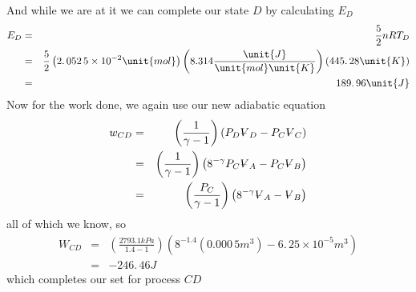 \documentclass{article}
\begin{document}
And while we are at it we can complete our state $D$ by calculating $E_{D}$%
\begin{eqnarray*}
E_{D} &=&\frac{5}{2}nRT_{D} \\
&=&\frac{5}{2}\left( \allowbreak 2.\,\allowbreak 052\,5\times 10^{-2}\unit{%
mol}\right) \left( 8.314\frac{\unit{J}}{\unit{mol}\unit{K}}\right) \left(
445.\,\allowbreak 28\unit{K}\right) \\
&=&189.\,\allowbreak 96\unit{J}
\end{eqnarray*}%
Now for the work done, we again use our new adiabatic equation 
\begin{eqnarray*}
w_{CD} &=&\left( \frac{1}{\gamma -1}\right) \left( P_{D}%
\ooalign{\hfil$V$\hfil\cr\kern0.1em--\hfil\cr}%
_{D}-P_{C}%
\ooalign{\hfil$V$\hfil\cr\kern0.1em--\hfil\cr}%
_{C}\right) \\
&=&\left( \frac{1}{\gamma -1}\right) \left( 8^{-\gamma }P_{C}%
\ooalign{\hfil$V$\hfil\cr\kern0.1em--\hfil\cr}%
_{A}-P_{C}%
\ooalign{\hfil$V$\hfil\cr\kern0.1em--\hfil\cr}%
_{B}\right) \\
&=&\left( \frac{P_{C}}{\gamma -1}\right) \left( 8^{-\gamma }%
\ooalign{\hfil$V$\hfil\cr\kern0.1em--\hfil\cr}%
_{A}-%
\ooalign{\hfil$V$\hfil\cr\kern0.1em--\hfil\cr}%
_{B}\right)
\end{eqnarray*}%
all of which we know, so%
\begin{eqnarray*}
W_{CD} &=&\left( \frac{2793.1\unit{kPa}}{1.4-1}\right) \left( 8^{-1.4}\left(
0.000\,5\unit{m}^{3}\right) -6.\,25\times 10^{-5}\unit{m}^{3}\right) \\
&=&-246.\,\allowbreak 46\unit{J}
\end{eqnarray*}%
which completes our set for process $CD$ 
\end{document}
